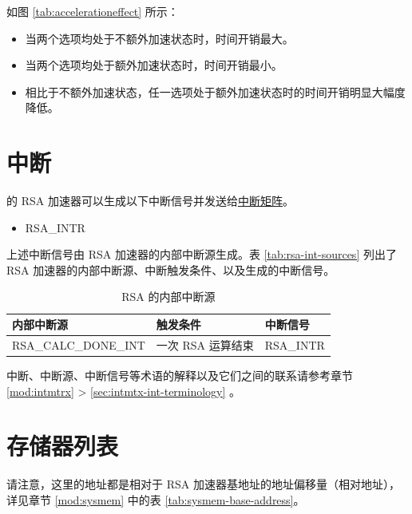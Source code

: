 \documentclass[main\_\_CN.tex]{subfiles}
\begin{document}
如图 \ref{tab:accelerationeffect} 所示：
\begin{itemize}
    \item 当两个选项均处于不额外加速状态时，时间开销最大。
    \item 当两个选项均处于额外加速状态时，时间开销最小。
    \item 相比于不额外加速状态，任一选项处于额外加速状态时的时间开销明显大幅度降低。
\end{itemize}



\section{中断}

\chipname{} 的 RSA 加速器可以生成以下中断信号并发送给\hyperref[mod:intmtrx]{中断矩阵}。
    \begin{itemize}
        \item RSA\_INTR
    \end{itemize}

上述中断信号由 RSA 加速器的内部中断源生成。表 \ref{tab:rsa-int-sources} 列出了 RSA 加速器的内部中断源、中断触发条件、以及生成的中断信号。

\begin{longtable}{ | L{5cm} | L{6.5cm} | L{4cm} | }
\caption{RSA 的内部中断源} \label{tab:rsa-int-sources}
\\ \hline
{}
\textbf{内部中断源} & \textbf{触发条件}  &  \textbf{中断信号}\\ \hline
\label{int:RSACALCDONEINT}RSA\_CALC\_DONE\_INT  & 一次 RSA 运算结束 &  RSA\_INTR  \\ \hline
\end{longtable}

\begin{tiplisting}
中断、中断源、中断信号等术语的解释以及它们之间的联系请参考章节 \ref{mod:intmtrx} \textit{} > \ref{sec:intmtx-int-terminology} \textit{}。
\end{tiplisting}

\newpage
\section{存储器列表 }\label{sec:mem-sum}
请注意，这里的地址都是相对于 RSA 加速器基地址的地址偏移量（相对地址），详见章节 \ref{mod:sysmem} \textit{} 中的表 \ref{tab:sysmem-base-address}。
\end{document}
